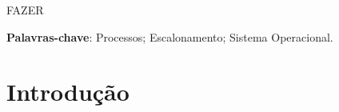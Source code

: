 \documentclass[
	12pt,				%
	oneside,   	        %
	a4paper,			%
	english,			%
	french,				%
	spanish,			%
	brazil,				%
	]{pacotes/abntex2}
\begin{document}
\frenchspacing 



\imprimirfolhaderosto



\begin{resumo}
FAZER 
\vspace{\onelineskip}
    
 \noindent
 \textbf{Palavras-chave}: Processos; Escalonamento; Sistema Operacional.
\end{resumo}




\tableofcontents*
\cleardoublepage

\textual

\makeatletter
\renewcommand{\chapter}{\@gobbletwo}
\makeatother

\section{Introdução}
\label{sec:introducao}
\end{document}
